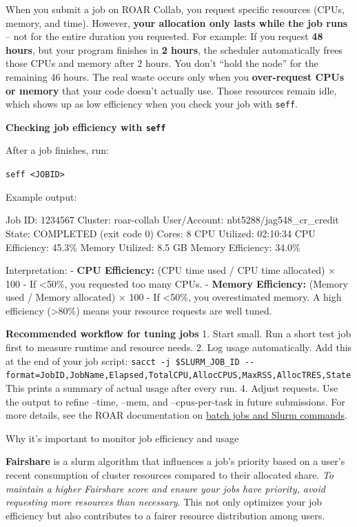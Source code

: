\documentclass[
]{book}
\begin{document}
When you submit a job on ROAR Collab, you request specific resources (CPUs, memory, and time). However, \textbf{your allocation only lasts while the job runs} -- not for the entire duration you requested.
For example: If you request \textbf{48 hours}, but your program finishes in \textbf{2 hours}, the scheduler automatically frees those CPUs and memory after 2 hours.
You don't ``hold the node'' for the remaining 46 hours.
The real waste occurs only when you \textbf{over-request CPUs or memory} that your code doesn't actually use.
Those resources remain idle, which shows up as low efficiency when you check your job with \texttt{seff}.

\textbf{Checking job efficiency with \texttt{seff}}

After a job finishes, run:

\texttt{seff\ \textless{}JOBID\textgreater{}}

Example output:

Job ID: 1234567
Cluster: roar-collab
User/Account: nbt5288/jag548\_cr\_credit
State: COMPLETED (exit code 0)
Cores: 8
CPU Utilized: 02:10:34
CPU Efficiency: 45.3\%
Memory Utilized: 8.5 GB
Memory Efficiency: 34.0\%

Interpretation:
- \textbf{CPU Efficiency:} (CPU time used / CPU time allocated) × 100
- If \textless50\%, you requested too many CPUs.
- \textbf{Memory Efficiency:} (Memory used / Memory allocated) × 100
- If \textless50\%, you overestimated memory.
A high efficiency (\textgreater80\%) means your resource requests are well tuned.

\textbf{Recommended workflow for tuning jobs}
1. Start small.
Run a short test job first to measure runtime and resource needs.
2. Log usage automatically.
Add this at the end of your job script:
\texttt{sacct\ -j\ \$SLURM\_JOB\_ID\ -\/-format=JobID,JobName,Elapsed,TotalCPU,AllocCPUS,MaxRSS,AllocTRES,State}
This prints a summary of actual usage after every run.
4. Adjust requests.
Use the output to refine --time, --mem, and --cpus-per-task in future submissions.
For more details, see the ROAR documentation on \href{https://docs.icds.psu.edu/running-jobs/batch-jobs/\#slurm-commands}{batch jobs and Slurm commands}.

Why it's important to monitor job efficiency and usage

\textbf{Fairshare} is a slurm algorithm that influences a job's priority based on a user's recent consumption of cluster resources compared to their allocated share. \emph{To maintain a higher Fairshare score and ensure your jobs have priority, avoid requesting more resources than necessary}. This not only optimizes your job efficiency but also contributes to a fairer resource distribution among users.
\end{document}
